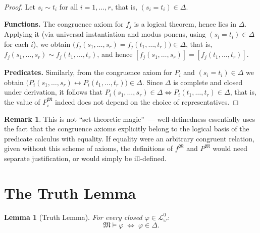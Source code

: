 \documentclass[12pt, a4paper]{article}
\theoremstyle{plain}
\newtheorem{lemma}[theorem]{Lemma}
\theoremstyle{definition}
\newtheorem{remark}[theorem]{Remark}
\renewcommand{\models}{\vDash}
\newcommand{\Lw}{\mathcal{L}_\omega}
\newcommand{\Struct}{\mathfrak{M}}
\begin{document}
\begin{proof}
Let $s_i \sim t_i$ for all $i = 1,\ldots,r$, that is,
$(s_i = t_i) \in \Delta$.

\textbf{Functions.} The congruence axiom for $f_j$ is a logical
theorem, hence lies in $\Delta$. Applying it (via universal instantiation
and modus ponens, using $(s_i = t_i) \in \Delta$ for each $i$),
we obtain
$\bigl(f_j(s_1,\ldots,s_r) = f_j(t_1,\ldots,t_r)\bigr) \in \Delta$,
that is, $f_j(s_1,\ldots,s_r) \sim f_j(t_1,\ldots,t_r)$, and hence
$[f_j(s_1,\ldots,s_r)] = [f_j(t_1,\ldots,t_r)]$.

\textbf{Predicates.} Similarly, from the congruence axiom for $P_i$
and $(s_i=t_i)\in\Delta$ we obtain
$\bigl(P_i(s_1,\ldots,s_r) \leftrightarrow P_i(t_1,\ldots,t_r)\bigr) \in \Delta$.
Since $\Delta$ is complete and closed under derivation, it follows that
$P_i(s_1,\ldots,s_r) \in \Delta \iff P_i(t_1,\ldots,t_r) \in \Delta$,
that is, the value of $P_i^{\Struct}$ indeed does not depend on the choice
of representatives.
\end{proof}

\begin{remark}
This is not ``set-theoretic magic''~--- well-definedness essentially
uses the fact that the congruence axioms explicitly belong to the logical
basis of the predicate calculus with equality. If equality were an
arbitrary congruent relation, given without this scheme of axioms,
the definitions of $f^{\Struct}$ and $P^{\Struct}$ would need separate
justification, or would simply be ill-defined.
\end{remark}

\section{The Truth Lemma}

\begin{lemma}[Truth Lemma]\label{lem:truth}
For every closed $\varphi \in \Lw^0$:
\[
  \Struct \models \varphi \;\iff\; \varphi \in \Delta.
\]
\end{lemma}
\end{document}
